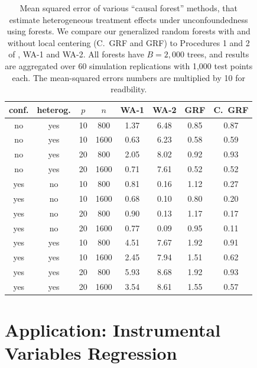 \documentclass[aos]{imsart}
\theoremstyle{plain}
\theoremstyle{definition}
\theoremstyle{remark}
\begin{document}
\begin{CJK}{UTF8}{gbsn}
\begin{table}[t]
\centering
\begin{tabular}{||cc|cc||cc|cc||}
\hline
conf. & heterog. & $p$ & $n$ & WA-1 & WA-2 & GRF & C.~GRF \\
  \hline
\hline
no & yes & 10 & 800 & 1.37 & 6.48 & 0.85 & 0.87 \\
  no & yes & 10 & 1600 & 0.63 & 6.23 & 0.58 & 0.59 \\
  no & yes & 20 & 800 & 2.05 & 8.02 & 0.92 & 0.93 \\
  no & yes & 20 & 1600 & 0.71 & 7.61 & 0.52 & 0.52 \\
   \hline
yes & no & 10 & 800 & 0.81 & 0.16 & 1.12 & 0.27 \\
  yes & no & 10 & 1600 & 0.68 & 0.10 & 0.80 & 0.20 \\
  yes & no & 20 & 800 & 0.90 & 0.13 & 1.17 & 0.17 \\
  yes & no & 20 & 1600 & 0.77 & 0.09 & 0.95 & 0.11 \\
   \hline
yes & yes & 10 & 800 & 4.51 & 7.67 & 1.92 & 0.91 \\
  yes & yes & 10 & 1600 & 2.45 & 7.94 & 1.51 & 0.62 \\
  yes & yes & 20 & 800 & 5.93 & 8.68 & 1.92 & 0.93 \\
  yes & yes & 20 & 1600 & 3.54 & 8.61 & 1.55 & 0.57 \\
   \hline
\end{tabular}
\caption{Mean squared error of various ``causal forest'' methods, that
estimate heterogeneous treatment effects under unconfoundedness using forests.
We compare our generalized random forests with and without local centering (C.~GRF and GRF)
to Procedures 1 and 2 of \citet{wager2015estimation}, WA-1 and WA-2.
All forests have $B=2,000$ trees, and results are aggregated over 60 simulation replications
with 1,000 test points each. The mean-squared errors numbers are multiplied by 10 for readbility.}
\label{tab:cf_simu}
\vspace{-1.5\baselineskip}
\end{table}


\section{Application: Instrumental Variables Regression}
\label{sec:iv}


\end{CJK}
\end{document}
